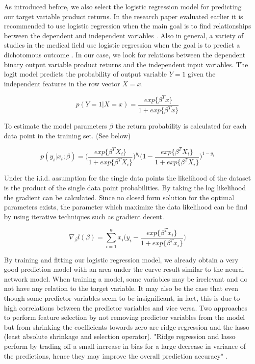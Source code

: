 \documentclass[12pt]{article}
\begin{document}
As introduced before, we also select the logistic regression model for predicting our target variable product returns. In the research paper evaluated earlier it is recommended to use logistic regression when the main goal is to find relationships between the dependent and independent variables \cite{tu1996advantages}. Also in general, a variety of studies in the medical field use logistic regression when the goal is to predict a dichotomous outcome \cite{yusuff2012breast}. In our case, we look for relations between the dependent binary output variable product returns and the independent input variables. The logit model predicts the probability of output variable $Y = 1$ given the independent features in the row vector $X = x$. 
\begin{center}
	\begin{equation}
		p(Y=1|X=x) = \frac{exp\{\beta^Tx\}}{1+exp\{\beta^Tx\}}
	\end{equation}
\end{center}
To estimate the model parameters $\beta$ the return probability is calculated for each data point in the training set. (See below)
\begin{center}
	\begin{equation}
				p(y_i|x_i;\beta)=\Big(\frac{exp\{\beta^T X_i\}}{1+exp\{\beta^TX_i\}}\Big)^{y_i}\Big(1-\frac{exp\{\beta^T X_i\}}{1+exp\{\beta^TX_i\}}\Big)^{1-y_i}
	\end{equation}
\end{center}
Under the i.i.d. assumption for the single data points the likelihood of the dataset is the product of the single data point probabilities. By taking the log likelihood the gradient can be calculated. Since no closed form solution for the optimal parameters exists, the parameter which maximize the data likelihood can be find by using iterative techniques such as gradient decent.
\begin{center}
	\begin{equation}
\nabla_{\beta}l(\beta)=\sum_{i=1}^nx_i\Big(y_i-\frac{exp\{\beta^T x_i\}}{1+exp\{\beta^Tx_i\}}\Big)
	\end{equation}
\end{center}
By training and fitting our logistic regression model, we already obtain a very good prediction model with an area under the curve result similar to the neural network model. When training a model, some variables may be irrelevant and do not have any relation to the target variable. It may also be the case that even though some predictor variables seem to be insignificant, in fact, this is due to high correlations between the predictor variables and vice versa. Two approaches to perform feature selection by not removing predictor variables from the model but from shrinking the coefficients towards zero are ridge regression and the lasso (least absolute shrinkage and selection operator).  "Ridge regression and lasso perform by trading off a small increase in bias for a large decrease in variance of the predictions, hence they may improve the overall prediction accuracy" \cite{pereira2016logistic}.
\end{document}
